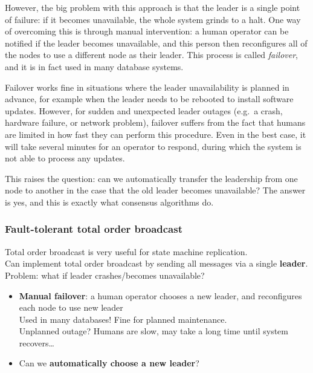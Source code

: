 However, the big problem with this approach is that the leader is a single point of failure: if it becomes unavailable, the whole system grinds to a halt.
One way of overcoming this is through manual intervention: a human operator can be notified if the leader becomes unavailable, and this person then reconfigures all of the nodes to use a different node as their leader.
This process is called \emph{failover}, and it is in fact used in many database systems.

Failover works fine in situations where the leader unavailability is planned in advance, for example when the leader needs to be rebooted to install software updates.
However, for sudden and unexpected leader outages (e.g.\ a crash, hardware failure, or network problem), failover suffers from the fact that humans are limited in how fast they can perform this procedure.
Even in the best case, it will take several minutes for an operator to respond, during which the system is not able to process any updates.

This raises the question: can we automatically transfer the leadership from one node to another in the case that the old leader becomes unavailable?
The answer is yes, and this is exactly what consensus algorithms do.

\begin{frame}
    \label{s:failover}
    \frametitle{Fault-tolerant total order broadcast}
    Total order broadcast is very useful for state machine replication.\\[0.5em]
    Can implement total order broadcast by sending all messages via a single \textbf{leader}.\\[0.5em]
    Problem: what if leader crashes/becomes unavailable?\\\pause
    \begin{itemize}
        \item \textbf{Manual failover}: a human operator chooses a new leader, and reconfigures each node to use new leader\\[0.5em]
            Used in many databases! Fine for planned maintenance.\\[0.5em]\pause
            Unplanned outage? Humans are slow, may take a long time until system recovers\dots\\[0.5em]\pause
        \item Can we \textbf{automatically choose a new leader}?
    \end{itemize}
\end{frame}
\label{l:failover}

